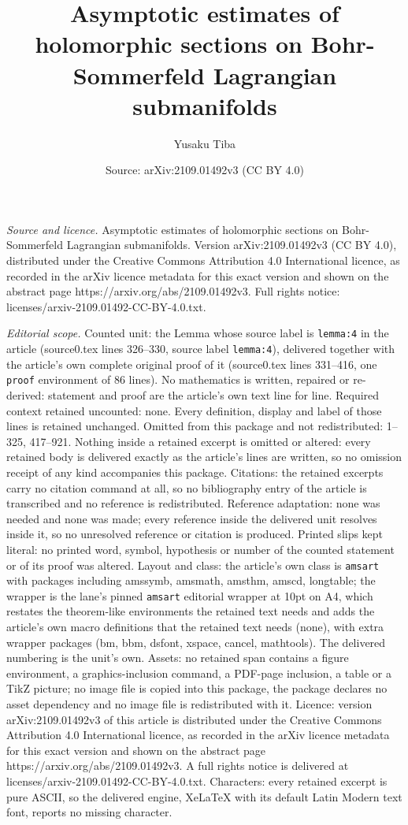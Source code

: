 \documentclass[10pt,a4paper]{amsart}
\title[Asymptotic estimates of holomorphic sections on Bohr-Sommerf]{Asymptotic estimates of holomorphic sections on Bohr-Sommerfeld Lagrangian submanifolds}
\author{Yusaku Tiba}
\date{Source: arXiv:2109.01492v3 (CC BY 4.0)}
\begin{document}
\maketitle

\noindent\emph{Source and licence.} Asymptotic estimates of holomorphic sections on Bohr-Sommerfeld Lagrangian submanifolds. Version arXiv:2109.01492v3 (CC BY 4.0), distributed under the Creative Commons Attribution 4.0 International licence, as recorded in the arXiv licence metadata for this exact version and shown on the abstract page https://arxiv.org/abs/2109.01492v3. Full rights notice: licenses/arxiv-2109.01492-CC-BY-4.0.txt.\par\smallskip

\noindent\textit{Editorial scope.} Counted unit: the Lemma whose source label is \texttt{lemma:4} in the article (source0.tex lines 326--330, source label \texttt{lemma:4}), delivered together with the article's own complete original proof of it (source0.tex lines 331--416, one \texttt{proof} environment of 86 lines). No mathematics is written, repaired or re-derived: statement and proof are the article's own text line for line. Required context retained uncounted: none. Every definition, display and label of those lines is retained unchanged. Omitted from this package and not redistributed: 1--325, 417--921. Nothing inside a retained excerpt is omitted or altered: every retained body is delivered exactly as the article's lines are written, so no omission receipt of any kind accompanies this package. Citations: the retained excerpts carry no citation command at all, so no bibliography entry of the article is transcribed and no reference is redistributed. Reference adaptation: none was needed and none was made; every reference inside the delivered unit resolves inside it, so no unresolved reference or citation is produced. Printed slips kept literal: no printed word, symbol, hypothesis or number of the counted statement or of its proof was altered. Layout and class: the article's own class is \texttt{amsart} with packages including amssymb, amsmath, amsthm, amscd, longtable; the wrapper is the lane's pinned \texttt{amsart} editorial wrapper at 10pt on A4, which restates the theorem-like environments the retained text needs and adds the article's own macro definitions that the retained text needs (none), with extra wrapper packages (bm, bbm, dsfont, xspace, cancel, mathtools). The delivered numbering is the unit's own. Assets: no retained span contains a figure environment, a graphics-inclusion command, a PDF-page inclusion, a table or a TikZ picture; no image file is copied into this package, the package declares no asset dependency and no image file is redistributed with it. Licence: version arXiv:2109.01492v3 of this article is distributed under the Creative Commons Attribution 4.0 International licence, as recorded in the arXiv licence metadata for this exact version and shown on the abstract page https://arxiv.org/abs/2109.01492v3. A full rights notice is delivered at licenses/arxiv-2109.01492-CC-BY-4.0.txt. Characters: every retained excerpt is pure ASCII, so the delivered engine, XeLaTeX with its default Latin Modern text font, reports no missing character.
\end{document}
